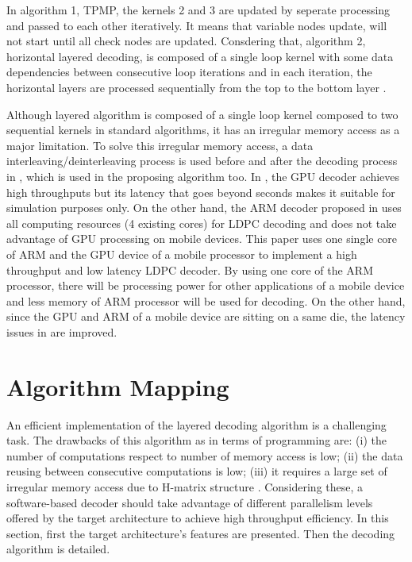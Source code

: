 \documentclass[conference]{IEEEtran}
\begin{document}
In algorithm 1, TPMP, the kernels 2 and 3 are updated by seperate processing and passed to each other iteratively. It means that variable nodes update, will not start until all check nodes are updated. Consdering that, algorithm 2, horizontal layered decoding, is composed of a single loop kernel with some data dependencies between consecutive loop iterations and in each iteration, the horizontal layers are processed sequentially from the top to the bottom layer \cite{art_quasi}.

Although layered algorithm is composed of a single loop kernel composed to two sequential kernels in standard algorithms, it has an irregular memory access as a major limitation. To solve this irregular memory access, a data interleaving/deinterleaving process is used before and after the decoding process in \cite{art_gpu_0, art_neon}, which is used in the proposing algorithm too. In \cite{art_gpu_0}, the GPU decoder achieves high throughputs but its latency that goes beyond seconds makes it suitable for simulation purposes only. On the other hand, the ARM decoder proposed in \cite{art_neon} uses all computing resources (4 existing cores) for LDPC decoding and does not take advantage of GPU processing on mobile devices. This paper uses one single core of ARM and the GPU device of a mobile processor to implement a high throughput and low latency LDPC decoder. By using one core of the ARM processor, there will be processing power for other applications of a mobile device and less memory of ARM processor will be used for decoding. On the other hand, since the GPU and ARM of a mobile device are sitting on a same die, the latency issues in \cite{art_gpu_0} are improved.

\section{Algorithm Mapping}\label{sec3}

An efficient implementation of the layered decoding algorithm is a challenging task. The drawbacks of this algorithm as in terms of programming are: (i) the number of computations respect to number of memory access is low; (ii) the data reusing between consecutive computations is low; (iii) it requires a large set of irregular memory access due to H-matrix structure \cite{art_ldpc_cpu1}. Considering these, a software-based decoder should take advantage of different parallelism levels offered by the target architecture to achieve high throughput efficiency. In this section, first the target architecture's features are presented. Then the decoding algorithm is detailed.
\end{document}
